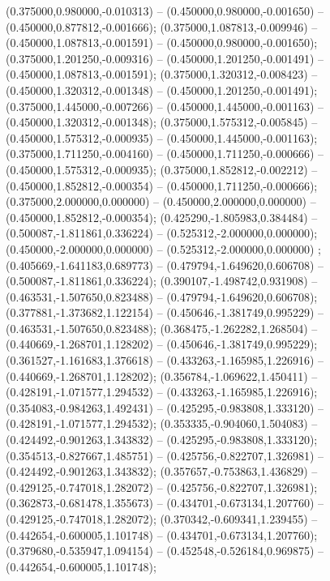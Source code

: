  (0.375000,0.980000,-0.010313) -- (0.450000,0.980000,-0.001650) -- (0.450000,0.877812,-0.001666);
 (0.375000,1.087813,-0.009946) -- (0.450000,1.087813,-0.001591) -- (0.450000,0.980000,-0.001650);
 (0.375000,1.201250,-0.009316) -- (0.450000,1.201250,-0.001491) -- (0.450000,1.087813,-0.001591);
 (0.375000,1.320312,-0.008423) -- (0.450000,1.320312,-0.001348) -- (0.450000,1.201250,-0.001491);
 (0.375000,1.445000,-0.007266) -- (0.450000,1.445000,-0.001163) -- (0.450000,1.320312,-0.001348);
 (0.375000,1.575312,-0.005845) -- (0.450000,1.575312,-0.000935) -- (0.450000,1.445000,-0.001163);
 (0.375000,1.711250,-0.004160) -- (0.450000,1.711250,-0.000666) -- (0.450000,1.575312,-0.000935);
 (0.375000,1.852812,-0.002212) -- (0.450000,1.852812,-0.000354) -- (0.450000,1.711250,-0.000666);
 (0.375000,2.000000,0.000000) -- (0.450000,2.000000,0.000000) -- (0.450000,1.852812,-0.000354);
 (0.425290,-1.805983,0.384484) -- (0.500087,-1.811861,0.336224) -- (0.525312,-2.000000,0.000000);
 (0.450000,-2.000000,0.000000) -- (0.525312,-2.000000,0.000000) ;
 (0.405669,-1.641183,0.689773) -- (0.479794,-1.649620,0.606708) -- (0.500087,-1.811861,0.336224);
 (0.390107,-1.498742,0.931908) -- (0.463531,-1.507650,0.823488) -- (0.479794,-1.649620,0.606708);
 (0.377881,-1.373682,1.122154) -- (0.450646,-1.381749,0.995229) -- (0.463531,-1.507650,0.823488);
 (0.368475,-1.262282,1.268504) -- (0.440669,-1.268701,1.128202) -- (0.450646,-1.381749,0.995229);
 (0.361527,-1.161683,1.376618) -- (0.433263,-1.165985,1.226916) -- (0.440669,-1.268701,1.128202);
 (0.356784,-1.069622,1.450411) -- (0.428191,-1.071577,1.294532) -- (0.433263,-1.165985,1.226916);
 (0.354083,-0.984263,1.492431) -- (0.425295,-0.983808,1.333120) -- (0.428191,-1.071577,1.294532);
 (0.353335,-0.904060,1.504083) -- (0.424492,-0.901263,1.343832) -- (0.425295,-0.983808,1.333120);
 (0.354513,-0.827667,1.485751) -- (0.425756,-0.822707,1.326981) -- (0.424492,-0.901263,1.343832);
 (0.357657,-0.753863,1.436829) -- (0.429125,-0.747018,1.282072) -- (0.425756,-0.822707,1.326981);
 (0.362873,-0.681478,1.355673) -- (0.434701,-0.673134,1.207760) -- (0.429125,-0.747018,1.282072);
 (0.370342,-0.609341,1.239455) -- (0.442654,-0.600005,1.101748) -- (0.434701,-0.673134,1.207760);
 (0.379680,-0.535947,1.094154) -- (0.452548,-0.526184,0.969875) -- (0.442654,-0.600005,1.101748);
